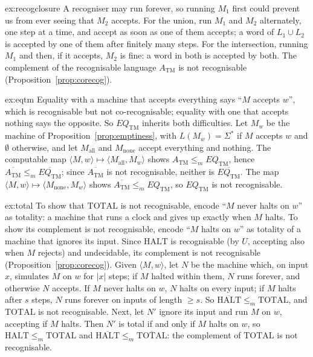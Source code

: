 \begin{solution}{ex:recogclosure}
\idea A recogniser may run forever, so running $M_1$ first could prevent us from ever seeing that $M_2$ accepts.
\writeup For the union, run $M_1$ and $M_2$ alternately, one step at a time, and accept as soon as one of them accepts; a word of $L_1\cup L_2$ is accepted by one of them after finitely many steps. For the intersection, running $M_1$ and then, if it accepts, $M_2$ is fine: a word in both is accepted by both. The complement of the recognisable language $A_{\mathrm{TM}}$ is not recognisable (Proposition~\ref{prop:corecog}).
\end{solution}

\begin{solution}{ex:eqtm}
\idea Equality with a machine that accepts everything says ``$M$ accepts $w$'', which is recognisable but not co-recognisable; equality with one that accepts nothing says the opposite. So $EQ_{\mathrm{TM}}$ inherits both difficulties.
\writeup Let $M_w$ be the machine of Proposition~\ref{prop:emptiness}, with $L(M_w)=\Sigma^*$ if $M$ accepts $w$ and $\emptyset$ otherwise, and let $M_{\mathrm{all}}$ and $M_{\mathrm{none}}$ accept everything and nothing. The computable map $\langle M,w\rangle\mapsto\langle M_{\mathrm{all}},M_w\rangle$ shows $A_{\mathrm{TM}}\le_mEQ_{\mathrm{TM}}$, hence $\overline{A_{\mathrm{TM}}}\le_m\overline{EQ_{\mathrm{TM}}}$; since $\overline{A_{\mathrm{TM}}}$ is not recognisable, neither is $\overline{EQ_{\mathrm{TM}}}$. The map $\langle M,w\rangle\mapsto\langle M_{\mathrm{none}},M_w\rangle$ shows $\overline{A_{\mathrm{TM}}}\le_mEQ_{\mathrm{TM}}$, so $EQ_{\mathrm{TM}}$ is not recognisable.
\end{solution}

\begin{solution}{ex:total}
\idea To show that $\mathrm{TOTAL}$ is not recognisable, encode ``$M$ never halts on $w$'' as totality: a machine that runs a clock and gives up exactly when $M$ halts. To show its complement is not recognisable, encode ``$M$ halts on $w$'' as totality of a machine that ignores its input.
\writeup Since $\mathrm{HALT}$ is recognisable (by $U$, accepting also when $M$ rejects) and undecidable, its complement is not recognisable (Proposition~\ref{prop:corecog}). Given $\langle M,w\rangle$, let $N$ be the machine which, on input $x$, simulates $M$ on $w$ for $|x|$ steps; if $M$ halted within them, $N$ runs forever, and otherwise $N$ accepts. If $M$ never halts on $w$, $N$ halts on every input; if $M$ halts after $s$ steps, $N$ runs forever on inputs of length $\ge s$. So $\overline{\mathrm{HALT}}\le_m\mathrm{TOTAL}$, and $\mathrm{TOTAL}$ is not recognisable. Next, let $N'$ ignore its input and run $M$ on $w$, accepting if $M$ halts. Then $N'$ is total if and only if $M$ halts on $w$, so $\mathrm{HALT}\le_m\mathrm{TOTAL}$ and $\overline{\mathrm{HALT}}\le_m\overline{\mathrm{TOTAL}}$: the complement of $\mathrm{TOTAL}$ is not recognisable.
\end{solution}

